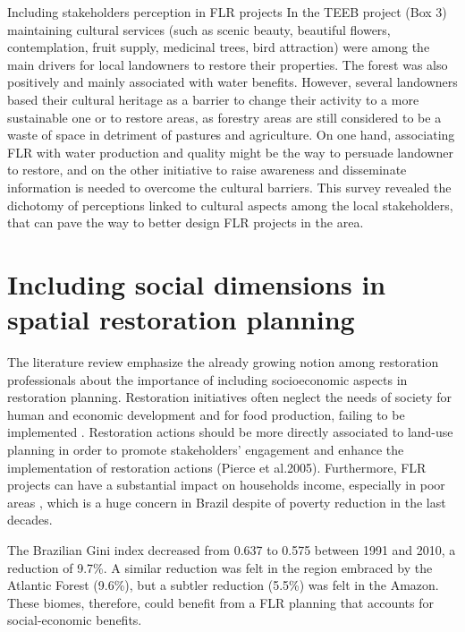 \newpage

\begin{mybox}{Including stakeholders perception in FLR projects}\label{Box5}
In the TEEB project (Box 3) maintaining cultural services (such as scenic beauty, beautiful flowers, contemplation, fruit supply, medicinal trees, bird attraction) were among the main drivers for local landowners to restore their properties. The forest was also positively and mainly associated with water benefits. However, several landowners based their cultural heritage as a barrier to change their activity to a more sustainable one or to restore areas, as forestry areas are still considered to be a waste of space in detriment of pastures and agriculture. On one hand, associating FLR with water production and quality might be the way to persuade landowner to restore, and on the other initiative to raise awareness and disseminate information is needed to overcome the cultural barriers. This survey  revealed the dichotomy of perceptions linked to cultural aspects among the local stakeholders, that can pave the way to better design FLR projects in the area.
\end{mybox}


\section{\Large Including social dimensions in spatial restoration planning } \label{sec:socio-spatial}

 The literature review emphasize the already growing notion among restoration professionals about the importance of including socioeconomic aspects in restoration planning. Restoration initiatives often neglect the needs of society for human and economic development and for food production, failing to be implemented \citep{DiMinin2017}. Restoration actions should be more directly associated to land-use planning in order to promote stakeholders' engagement and enhance the implementation of restoration actions (Pierce et al.2005). Furthermore, FLR projects can have a substantial impact on  households income, especially in poor areas \citep{Adams2016a, Jindal2012}, which is a huge concern in Brazil despite of poverty reduction in the last decades. 
 
 The Brazilian Gini index decreased from 0.637 to 0.575 between 1991 and 2010, a reduction of 9.7\%. A similar reduction was felt in the region embraced by the Atlantic Forest (9.6\%), but a subtler reduction (5.5\%) was felt in the Amazon. These biomes, therefore, could benefit from a FLR planning that accounts for social-economic benefits. 
 
